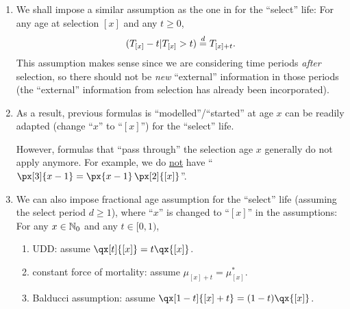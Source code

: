 \begin{enumerate}
\item We shall impose a similar assumption as the one in
 for the ``select'' life: For any age at selection
\([x]\) and any \(t\ge 0\),
\[
(T_{[x]}-t|T_{[x]}>t)\overset{d}= T_{[x]+t}.
\]
This assumption makes sense since we are considering time periods \emph{after}
selection, so there should not be \emph{new} ``external'' information in those
periods (the ``external'' information from selection has already been
incorporated).
\item As a result, previous formulas is ``modelled''/``started'' at age \(x\)
can be readily adapted (change ``\(x\)'' to ``\([x]\)'') for the ``select''
life.
\begin{warning}
However, formulas that ``pass through'' the selection age \(x\) generally do
not apply anymore. For example, we do \underline{not} have
``\(\px[3]{x-1}=\px{x-1}\,\px[2]{[x]}\)''.
\end{warning}
\item We can also impose fractional age assumption for the ``select'' life
(assuming the select period \(d\ge 1\)), where ``\(x\)'' is changed to
``\([x]\)'' in the assumptions: For any \(x\in\mathbb{N}_0\) and any \(t\in[0,1)\),
\begin{enumerate}
\item UDD:  assume \(\qx[t]{[x]}=t\qx{[x]}\).
\item constant force of mortality:  assume \(\mu_{[x]+t}=\mu_{[x]}^{*}\).
\item Balducci assumption:  assume \(\qx[1-t]{[x]+t}=(1-t)\qx{[x]}\).
\end{enumerate}
\end{enumerate}

